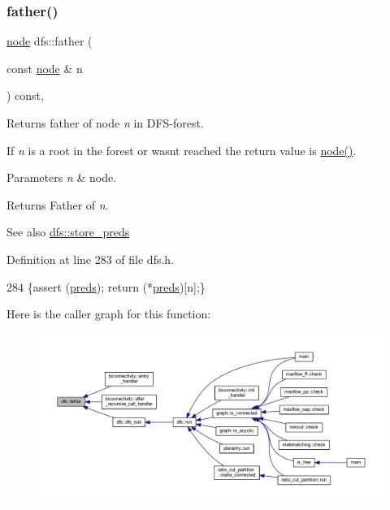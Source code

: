 \subsubsection{\texorpdfstring{father()}{father()}}
{\footnotesize\ttfamily \mbox{\hyperlink{classnode}{node}} dfs\+::father (\begin{DoxyParamCaption}\item[{const \mbox{\hyperlink{classnode}{node}} \&}]{n }\end{DoxyParamCaption}) const\hspace{0.3cm}{\ttfamily [inline]}, {\ttfamily [inherited]}}



Returns father of node {\itshape n} in D\+F\+S-\/forest. 

If {\itshape n} is a root in the forest or wasn\textquotesingle{}t reached the return value is {\ttfamily \mbox{\hyperlink{classnode}{node()}}}.


\begin{DoxyParams}{Parameters}
{\em n} & node. \\
\hline
\end{DoxyParams}
\begin{DoxyReturn}{Returns}
Father of {\itshape n}. 
\end{DoxyReturn}
\begin{DoxySeeAlso}{See also}
\mbox{\hyperlink{classdfs_a7043f46eb3887cbcbb1391fc783407a4}{dfs\+::store\+\_\+preds}} 
\end{DoxySeeAlso}


Definition at line 283 of file dfs.\+h.


\begin{DoxyCode}
284     \{assert (\mbox{\hyperlink{classdfs_a3fdeb5a211a1bc1753b2a637258c5355}{preds}}); \textcolor{keywordflow}{return} (*\mbox{\hyperlink{classdfs_a3fdeb5a211a1bc1753b2a637258c5355}{preds}})[n];\}
\end{DoxyCode}
Here is the caller graph for this function\+:
\nopagebreak
\begin{figure}[H]
\begin{center}
\leavevmode
\includegraphics[width=350pt]{classdfs_a3012717ce541b3e56943e2c2c50efdf6_icgraph}
\end{center}
\end{figure}
\mbox{\label{classbiconnectivity_a64adab869e0080e3a1f8479e70010317}} 
